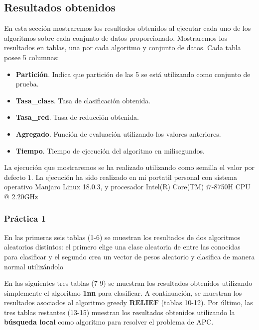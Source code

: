 \documentclass[size=a4, parskip=half, titlepage=false, toc=flat, toc=bib, 12pt]{scrartcl}
\begin{document}
\subsection{Resultados obtenidos}
En esta sección mostraremos los resultados obtenidos al ejecutar cada uno de los algoritmos sobre cada conjunto de datos proporcionado. Mostraremos los resultados en tablas, una por cada algoritmo y conjunto de datos. Cada tabla posee 5 columnas:
\begin{itemize}
    \item \textbf{Partición}. Indica que partición de las 5 se está utilizando como conjunto de prueba.
    \item \textbf{Tasa\_class}. Tasa de clasificación obtenida.
    \item \textbf{Tasa\_red}. Tasa de reducción obtenida.
    \item \textbf{Agregado}. Función de evaluación utilizando los valores anteriores.
    \item \textbf{Tiempo}. Tiempo de ejecución del algoritmo en milisegundos.
\end{itemize}

La ejecución que mostraremos se ha realizado utilizando como semilla el valor por defecto $1$. La ejecución ha sido realizado en mi portatil personal con sistema operativo Manjaro Linux 18.0.3, y procesador Intel(R) Core(TM) i7-8750H CPU @ 2.20GHz\\

\subsubsection{Práctica 1}
En las primeras seis tablas (1-6) se muestran los resultados de dos algoritmos aleatorios distintos: el primero elige una clase aleatoria de entre las conocidas para clasificar y el segundo crea un vector de pesos aleatorio y clasifica de manera normal utilizándolo

En las siguientes tres tablas (7-9) se muestran los resultados obtenidos utilizando simplemente el algoritmo \textbf{1nn} para clasificar. A continuación, se muestran los resultados asociados al algoritmo greedy \textbf{RELIEF} (tablas 10-12). Por último, las tres tablas restantes (13-15) muestran los resultados obtenidos utilizando la \textbf{búsqueda local} como algoritmo para resolver el problema de APC.
\end{document}
